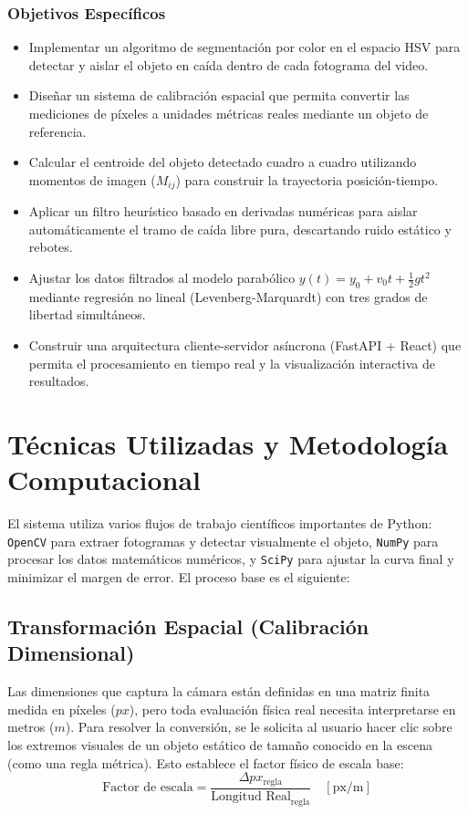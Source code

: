 \documentclass[12pt,a4paper]{article}
\begin{document}
\subsubsection{Objetivos Específicos}
\begin{itemize}
    \item Implementar un algoritmo de segmentación por color en el espacio HSV para detectar y aislar el objeto en caída dentro de cada fotograma del video.
    \item Diseñar un sistema de calibración espacial que permita convertir las mediciones de píxeles a unidades métricas reales mediante un objeto de referencia.
    \item Calcular el centroide del objeto detectado cuadro a cuadro utilizando momentos de imagen ($M_{ij}$) para construir la trayectoria posición-tiempo.
    \item Aplicar un filtro heurístico basado en derivadas numéricas para aislar automáticamente el tramo de caída libre pura, descartando ruido estático y rebotes.
    \item Ajustar los datos filtrados al modelo parabólico $y(t) = y_0 + v_0 t + \frac{1}{2}gt^2$ mediante regresión no lineal (Levenberg-Marquardt) con tres grados de libertad simultáneos.
    \item Construir una arquitectura cliente-servidor asíncrona (FastAPI + React) que permita el procesamiento en tiempo real y la visualización interactiva de resultados.
\end{itemize}

\section{Técnicas Utilizadas y Metodología Computacional}
El sistema utiliza varios flujos de trabajo científicos importantes de Python: \texttt{OpenCV} para extraer fotogramas y detectar visualmente el objeto, \texttt{NumPy} para procesar los datos matemáticos numéricos, y \texttt{SciPy} para ajustar la curva final y minimizar el margen de error. El proceso base es el siguiente:

\subsection{Transformación Espacial (Calibración Dimensional)}
Las dimensiones que captura la cámara están definidas en una matriz finita medida en píxeles ($px$), pero toda evaluación física real necesita interpretarse en metros ($m$). Para resolver la conversión, se le solicita al usuario hacer clic sobre los extremos visuales de un objeto estático de tamaño conocido en la escena (como una regla métrica). Esto establece el factor físico de escala base:
$$
\text{Factor de escala} = \frac{\Delta px_{\text{regla}}}{\text{Longitud Real}_{\text{regla}}} \quad [\text{px/m}]
$$
\end{document}
